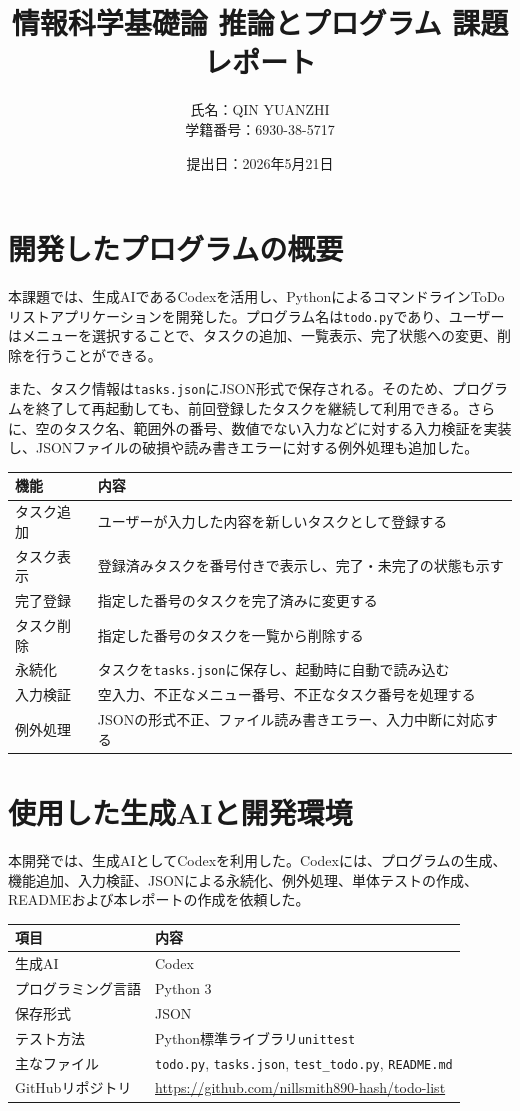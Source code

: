 \documentclass[uplatex,a4paper,11pt]{jsarticle}
\title{情報科学基礎論 推論とプログラム 課題レポート}
\author{氏名：QIN YUANZHI\\学籍番号：6930-38-5717}
\date{提出日：2026年5月21日}
\begin{document}
\maketitle

\section{開発したプログラムの概要}

本課題では、生成AIであるCodexを活用し、PythonによるコマンドラインToDoリストアプリケーションを開発した。プログラム名は\texttt{todo.py}であり、ユーザーはメニューを選択することで、タスクの追加、一覧表示、完了状態への変更、削除を行うことができる。

また、タスク情報は\texttt{tasks.json}にJSON形式で保存される。そのため、プログラムを終了して再起動しても、前回登録したタスクを継続して利用できる。さらに、空のタスク名、範囲外の番号、数値でない入力などに対する入力検証を実装し、JSONファイルの破損や読み書きエラーに対する例外処理も追加した。

\begin{longtable}{ll}
\toprule
機能 & 内容 \\
\midrule
タスク追加 & ユーザーが入力した内容を新しいタスクとして登録する \\
タスク表示 & 登録済みタスクを番号付きで表示し、完了・未完了の状態も示す \\
完了登録 & 指定した番号のタスクを完了済みに変更する \\
タスク削除 & 指定した番号のタスクを一覧から削除する \\
永続化 & タスクを\texttt{tasks.json}に保存し、起動時に自動で読み込む \\
入力検証 & 空入力、不正なメニュー番号、不正なタスク番号を処理する \\
例外処理 & JSONの形式不正、ファイル読み書きエラー、入力中断に対応する \\
\bottomrule
\end{longtable}

\section{使用した生成AIと開発環境}

本開発では、生成AIとしてCodexを利用した。Codexには、プログラムの生成、機能追加、入力検証、JSONによる永続化、例外処理、単体テストの作成、READMEおよび本レポートの作成を依頼した。

\begin{longtable}{ll}
\toprule
項目 & 内容 \\
\midrule
生成AI & Codex \\
プログラミング言語 & Python 3 \\
保存形式 & JSON \\
テスト方法 & Python標準ライブラリ\texttt{unittest} \\
主なファイル & \texttt{todo.py}, \texttt{tasks.json}, \texttt{test\_todo.py}, \texttt{README.md} \\
GitHubリポジトリ & \url{https://github.com/nillsmith890-hash/todo-list} \\
\bottomrule
\end{longtable}
\end{document}
